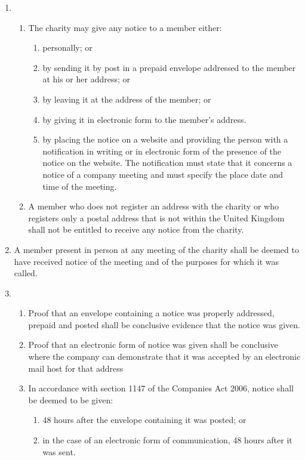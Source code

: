 \begin{enumerate}
\item
  \begin{enumerate}
  \item
    The charity may give any notice to a member either:
    \begin{enumerate}
    \item
      personally; or
    \item
      by sending it by post in a prepaid envelope addressed to the member
      at his or her address; or
    \item
      by leaving it at the address of the member; or
    \item
      by giving it in electronic form to the member's address.
    \item
      by placing the notice on a website and providing the person with a
      notification in writing or in electronic form of the presence of
      the notice on the website. The notification must state that it
      concerns a notice of a company meeting and must specify the place
      date and time of the meeting.
    \end{enumerate}
  \item
    A member who does not register an address with the charity or who
    registers only a postal address that is not within the United
    Kingdom shall not be entitled to receive any notice from the
    charity.
  \end{enumerate}
\item
  A member present in person at any meeting of the charity shall be
  deemed to have received notice of the meeting and of the purposes
  for which it was called.

\item
  \begin{enumerate}
  \item
    Proof that an envelope containing a notice was properly addressed,
    prepaid and posted shall be conclusive evidence that the notice was
    given.
  \item
    Proof that an electronic form of notice was given shall be
    conclusive where the company can demonstrate that it was
    accepted by an electronic mail host for that address
  \item
    In accordance with section 1147 of the Companies Act 2006, notice
    shall be deemed to be given:
    \begin{enumerate}
    \item
      48 hours after the envelope containing it was posted; or
    \item
      in the case of an electronic form of communication, 48 hours after
      it was sent.
    \end{enumerate}
  \end{enumerate}


\end{enumerate}
